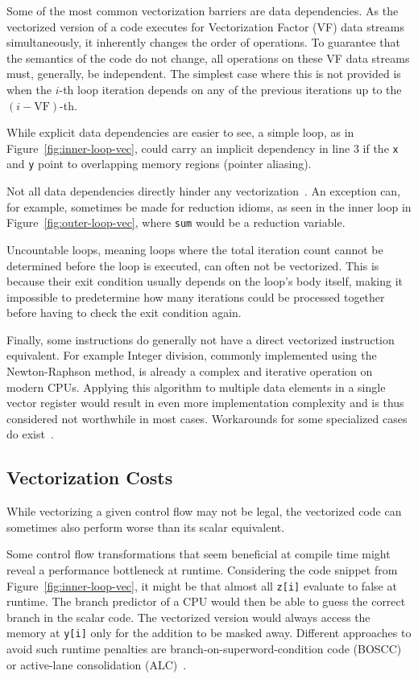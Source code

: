 \documentclass[sigplan,11pt,nonacm]{acmart}
\begin{document}
Some of the most common vectorization barriers are data dependencies. As the vectorized version
of a code executes for Vectorization Factor (VF) data streams simultaneously, it inherently changes
the order of operations. To guarantee that the semantics of the code do not change, all
operations on these VF data streams must, generally, be independent. The simplest case
where this is not provided is when the $i$-th loop iteration depends on any of the 
previous iterations up to the $(i-\text{VF})$-th.

While explicit data dependencies are easier to see, a simple loop, as in 
Figure~\ref{fig:inner-loop-vec}, could carry an implicit dependency in line 3 if
the \texttt{x} and \texttt{y} point to overlapping memory regions (pointer aliasing).

Not all data dependencies directly hinder any vectorization~\cite{datadepvec}. An exception can, for example, 
sometimes be made for reduction idioms, as seen in the inner loop in 
Figure~\ref{fig:outer-loop-vec}, where \texttt{sum} would be a reduction variable.

Uncountable loops, meaning loops where the total iteration count cannot be determined before the 
loop is executed, can often not be vectorized. This is because their exit condition usually depends on 
the loop's body itself, making it impossible to predetermine how many iterations could be processed together 
before having to check the exit condition again.

Finally, some instructions do generally not have a direct vectorized 
instruction equivalent. For example Integer division, commonly implemented using the 
Newton-Raphson method, is already a complex and iterative operation 
on modern CPUs. Applying this algorithm 
to multiple data elements in a single vector register would result in even more implementation complexity 
and is thus considered not worthwhile in most cases.
Workarounds for some specialized cases do exist~\cite{vecintdiv}.

\subsection{Vectorization Costs}
While vectorizing a given control flow may not be legal, the vectorized code can sometimes also perform 
worse than its scalar equivalent.

Some control flow transformations that seem beneficial at compile time might reveal a performance
bottleneck at runtime. Considering the code snippet from Figure~\ref{fig:inner-loop-vec}, it might
be that almost all \texttt{z[i]} evaluate to false at runtime. The branch predictor of a CPU
would then be able to guess the correct branch in the scalar code. The vectorized version would
always access the memory at \texttt{y[i]} only for the addition to be masked away. Different 
approaches to avoid such runtime penalties are branch-on-superword-condition code 
(BOSCC)~\cite{10.5555/1299042.1299055,llvmboscc} or active-lane 
consolidation (ALC)~\cite{10.1007/s11227-022-04359-w,10.5555/3615924.3615932}.
\end{document}
